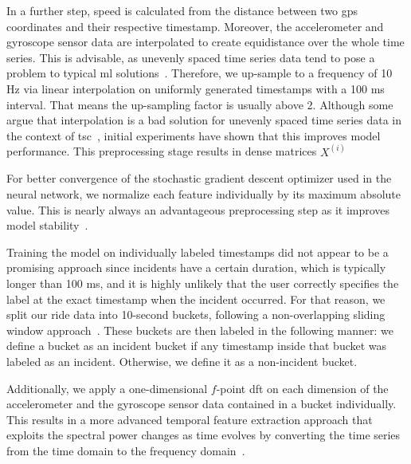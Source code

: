 In a further step, speed is calculated from the distance between two \ac{gps} coordinates and their respective timestamp.
Moreover, the accelerometer and gyroscope sensor data are interpolated to create equidistance over the whole time series.
This is advisable, as unevenly spaced time series data tend to pose a problem to typical \ac{ml} solutions~\cite{weerakody2021review}.
Therefore, we up-sample to a frequency of 10 Hz via linear interpolation on uniformly generated timestamps with a 100 ms interval.
That means the up-sampling factor is usually above 2.
Although some argue that interpolation is a bad solution for unevenly spaced time series data in the context of \ac{tsc}~\cite{hayashi2005covariance, eckner2012framework}, initial experiments have shown that this improves model performance.
This preprocessing stage results in dense matrices $X^{(i)}$

For better convergence of the stochastic gradient descent optimizer used in the neural network, we normalize each feature individually by its maximum absolute value.
This is nearly always an advantageous preprocessing step as it improves model stability~\cite{bishop1995neural}.

Training the model on individually labeled timestamps did not appear to be a promising approach since incidents have a certain duration, which is typically longer than 100 ms, and it is highly unlikely that the user correctly specifies the label at the exact timestamp when the incident occurred.
For that reason, we split our ride data into 10-second buckets, following a non-overlapping sliding window approach~\cite{ortiz2011dynamic}.
These buckets are then labeled in the following manner: we define a bucket as an incident bucket if any timestamp inside that bucket was labeled as an incident.
Otherwise, we define it as a non-incident bucket.

Additionally, we apply a one-dimensional $f$-point \ac{dft} on each dimension of the accelerometer and the gyroscope sensor data contained in a bucket individually.
This results in a more advanced temporal feature extraction approach that exploits the spectral power changes as time evolves by converting the time series from the time domain to the frequency domain~\cite{chen2021deep}.


